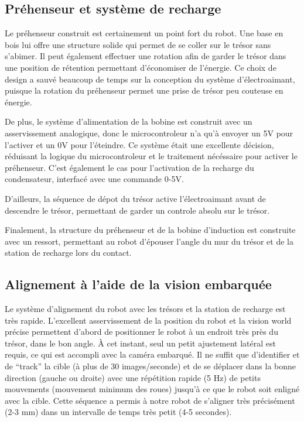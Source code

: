\subsection{Préhenseur et système de recharge}
Le préhenseur construit est certainement un point fort du robot. Une base en bois lui offre une structure solide qui permet de se coller sur le trésor sans s’abimer. Il peut également effectuer une rotation afin de garder le trésor dans une position de rétention permettant d’économiser de l’énergie. Ce choix de design a sauvé beaucoup de temps sur la conception du système d’électroaimant, puisque la rotation du préhenseur permet une prise de trésor peu couteuse en énergie.

De plus, le système d’alimentation de la bobine est construit avec un asservissement analogique, donc le microcontroleur n’a qu’à envoyer un 5V pour l’activer et un 0V pour l’éteindre. Ce système était une excellente décision, réduisant la logique du microcontroleur et le traitement nécéssaire pour activer le préhenseur. C’est également le cas pour l’activation de la recharge du condensateur, interfacé avec une commande 0-5V.

D’ailleurs, la séquence de dépot du trésor active l’électroaimant avant de descendre le trésor, permettant de garder un controle absolu sur le trésor.

Finalement, la structure du préhenseur et de la bobine d’induction est construite avec un ressort, permettant au robot d’épouser l’angle du mur du trésor et de la station de recharge lors du contact.

\subsection{Alignement à l'aide de la vision embarquée}
Le système d’alignement du robot avec les trésors et la station de recharge est très rapide. L’excellent asservissement de la position du robot et la vision world précise permettent d’abord de positionner le robot à un endroit très près du trésor, dans le bon angle. À cet instant, seul un petit ajustement latéral est requis, ce qui est accompli avec la caméra embarqué. Il ne suffit que d’identifier et de “track” la cible (à plus de 30 images/seconde) et de se déplacer dans la bonne direction (gauche ou droite) avec une répétition rapide (5 Hz) de petits mouvements  (mouvement minimum des roues) jusqu’à ce que le robot soit enligné avec la cible. Cette séquence a permis à notre robot de s'aligner très précisément (2-3 mm) dans un intervalle de temps très petit (4-5 secondes).

